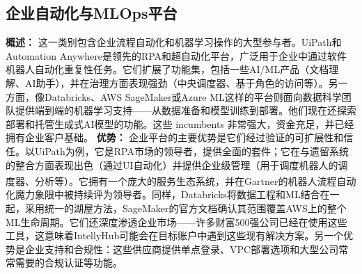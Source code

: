 \documentclass[11pt, a4paper, oneside]{article}
\begin{document}
\subsection{企业自动化与MLOps平台}
\textbf{概述：} 这一类别包含企业流程自动化和机器学习操作的大型参与者。UiPath和Automation Anywhere是领先的RPA和超自动化平台，广泛用于企业中通过软件机器人自动化重复性任务。它们扩展了功能集，包括一些AI/ML产品（文档理解、AI助手），并在治理方面表现强劲（中央调度器、基于角色的访问等）。另一方面，像Databricks、AWS SageMaker或Azure ML这样的平台则面向数据科学团队提供端到端的机器学习支持——从数据准备和模型训练到部署。他们现在还探索部署和托管生成式AI模型的功能。这些 incumbents 非常强大，资金充足，并已经拥有企业客户基础。
\newline\newline
\textbf{优势：} 企业平台的主要优势是它们经过验证的可扩展性和信任。以UiPath为例，它是RPA市场的领导者，提供全面的套件；它在与遗留系统的整合方面表现出色（通过UI自动化）并提供企业级管理（用于调度机器人的调度器、分析等）。它拥有一个庞大的服务生态系统，并在Gartner\textsuperscript{\textregistered}的机器人流程自动化魔力象限中被持续评为领导者\cite{uipathGartner}。同样，Databricks将数据工程和ML结合在一起，采用统一的湖屋方法，SageMaker的官方文档确认其范围覆盖AWS上的整个ML生命周期\cite{awsSagemaker}。它们还深度渗透企业市场——许多财富500强公司已经在使用这些工具，这意味着IntellyHub可能会在目标账户中遇到这些现有解决方案。另一个优势是企业支持和合规性：这些供应商提供单点登录、VPC部署选项和大型公司常常需要的合规认证等功能。
\newline\newline
\end{document}
